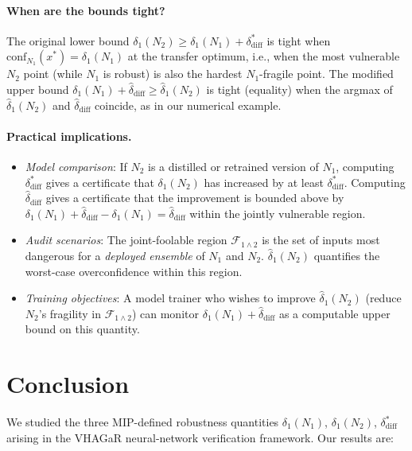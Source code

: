 \documentclass[12pt]{article}
\theoremstyle{definition}
\theoremstyle{plain}
\theoremstyle{remark}
\newcommand{\conf}[2]{\mathrm{conf}_{#1}(#2)}
\newcommand{\dN}[1]{\delta_1(N_{#1})}
\newcommand{\dNmod}[1]{\hat{\delta}_1(N_{#1})}
\newcommand{\ddiff}{\delta_{\mathrm{diff}}^{*}}
\newcommand{\ddiffmod}{\hat{\delta}_{\mathrm{diff}}}
\newcommand{\Fjoint}{\mathcal{F}_{1\wedge 2}}
\begin{document}
\paragraph{When are the bounds tight?}
The original lower bound $\dN{2}\geq\dN{1}+\ddiff$ is tight when
$\conf{N_1}{x^*}=\dN{1}$ at the transfer optimum, i.e., when the
most vulnerable $N_2$ point (while $N_1$ is robust) is also the
hardest $N_1$-fragile point.  The modified upper bound
$\dN{1}+\ddiffmod\geq\dNmod{2}$ is tight (equality) when the argmax of
$\dNmod{2}$ and $\ddiffmod$ coincide, as in our numerical example.

\paragraph{Practical implications.}
\begin{itemize}
  \item \emph{Model comparison}: If $N_2$ is a distilled or retrained
        version of $N_1$, computing $\ddiff$ gives a certificate that
        $\dN{2}$ has increased by at least $\ddiff$.  Computing
        $\ddiffmod$ gives a certificate that the improvement is bounded
        above by $\dN{1}+\ddiffmod-\dN{1}=\ddiffmod$ within the
        jointly vulnerable region.
  \item \emph{Audit scenarios}: The joint-foolable region $\Fjoint$ is
        the set of inputs most dangerous for a \emph{deployed ensemble}
        of $N_1$ and $N_2$. $\dNmod{2}$ quantifies the worst-case
        overconfidence within this region.
  \item \emph{Training objectives}: A model trainer who wishes to
        improve $\dNmod{2}$ (reduce $N_2$'s fragility in $\Fjoint$)
        can monitor $\dN{1}+\ddiffmod$ as a computable upper bound
        on this quantity.
\end{itemize}

\section{Conclusion}\label{sec:conclusion}

We studied the three MIP-defined robustness quantities $\dN{1}$,
$\dN{2}$, $\ddiff$ arising in the VHAGaR neural-network verification
framework.  Our results are:
\end{document}
